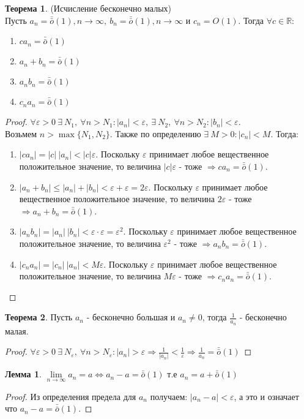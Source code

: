 \documentclass[a4paper, 12pt]{article}
\newcommand{\R}{\mathbb{R}}
\renewcommand{\epsilon}{\varepsilon}
\newcommand{\om}{\bar{\bar{o}}}
\theoremstyle{definition}
\newtheorem*{theorem}{Теорема}
\newtheorem*{lemma}{Лемма}
\begin{document}
        \begin{theorem} (Исчисление бесконечно малых)\\
            Пусть $a_n=\bar{\bar{o}}{(1)}, n\to \infty,\ b_n=\bar{\bar{o}}{(1)}, n\to \infty$ и $c_n=O(1)$. Тогда $\forall c\in \R$:
            \begin{enumerate}
                \item $ca_n=\bar{\bar{o}}{(1)}$
                \item $a_n+b_n=\bar{\bar{o}}{(1)}$
                \item $a_n b_n=\bar{\bar{o}}{(1)}$
                \item $c_n a_n=\bar{\bar{o}}{(1)}$
            \end{enumerate}
        \end{theorem} 
        \begin{proof}
            $\forall \epsilon>0\ \exists\ N_1,\ \forall n>N_1: |a_n|<\epsilon,\ \exists\ N_2,\ \forall n>N_2: |b_n|<\epsilon$.\\Возьмем $n>\max\{N_1,N_2\}$. Также по определению $\exists\ M>0: |c_n|<M$. Тогда:
            \begin{enumerate}
                \item $|c a_n|=|c|\ |a_n|<|c|\epsilon$. Поскольку $\epsilon$ принимает любое вещественное положительное значение, то величина $|c|\epsilon$ - тоже $\Rightarrow c a_n=\bar{\bar{o}}{(1)}$.
                \item $|a_n+b_n|\leq|a_n|+|b_n|<\epsilon+\epsilon=2\epsilon$. Поскольку $\epsilon$ принимает любое вещественное положительное значение, то величина $2\epsilon$ - тоже $\Rightarrow a_n+b_n=\bar{\bar{o}}{(1)}$.
                \item $|a_n b_n| = |a_n|\ |b_n|<\epsilon\cdot\epsilon=\epsilon^2$. Поскольку $\epsilon$ принимает любое вещественное положительное значение, то величина $\epsilon^2$ - тоже $\Rightarrow a_n b_n=\bar{\bar{o}}{(1)}$.
                \item $|c_n a_n|=|c_n|\ |a_n|<M\epsilon$. Поскольку $\epsilon$ принимает любое вещественное положительное значение, то величина $M\epsilon$ - тоже $\Rightarrow c_n a_n =\bar{\bar{o}}{(1)}$.
            \end{enumerate}
        \end{proof} 
        \begin{theorem}
            Пусть $a_n$ - бесконечно большая и $a_n\ne 0$, тогда $\frac{1}{a_n}$ - бесконечно малая.
        \end{theorem} 
        \begin{proof}
            $\forall \epsilon>0\ \exists\ N_{\epsilon},\ \forall n>N_{\epsilon}: |a_n|>\epsilon \Rightarrow \frac{1}{|a_n|}<\frac{1}{\epsilon} \Rightarrow \frac{1}{a_n}=\bar{\bar{o}}{(1)}$
        \end{proof} 
        \begin{lemma}
            $\lim\limits_{n\to \infty}a_n=a \Leftrightarrow a_n-a=\om(1)$ т.е $a_n=a+\bar{\bar{o}}{(1)}$
        \end{lemma} 
        \begin{proof}
            Из определения предела для $a_n$ получаем: $|a_n-a|<\epsilon$, а это и означает что $a_n-a=\bar{\bar{o}}{(1)}$.
        \end{proof} 
        \newpage
\end{document}
